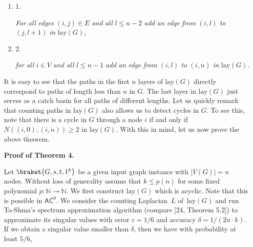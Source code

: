 \begin{enumerate}


\item[] 
1. 


\emph{For all edges }$(i,j)\in E$\emph{ and all }$l\leq n-2$\emph{ add an edge from }$(i,l)$\emph{ to }$(j,l+1)$\emph{ in }$\mathrm{lay}(G)$\emph{,}\par





\item[] 
2. 


\emph{for all }$i\in V$\emph{ and all }$l\leq n-1$\emph{ add an edge from }$(i,l)$\emph{ to }$(i,n)$\emph{ in }$\mathrm{lay}(G)$\emph{.}\par





\end{enumerate}






It is easy to see that the paths in the first $n$ layers of $\mathrm{lay}(G)$ directly correspond to paths of length less than $n$ in $G$.
The last layer in $\mathrm{lay}(G)$ just serves as a catch basin for all paths of different lengths.
Let us quickly remark that counting paths in $\mathrm{lay}(G)$ also allows us to detect cycles in $G$. To see this, note that there is a cycle in $G$ through a node $i$ if and only if $N((i,0),(i,n))\geq 2$ in $\mathrm{lay}(G)$.
With this in mind, let us now prove the above theorem.\par




\par\medskip\noindent\textbf{Proof of Theorem 4.}\par




Let $\braket{G,s,t,1^{k}}$ be a given input graph instance with $|V(G)|=n$ nodes.
Without loss of generality assume that $k\leq p(n)$ for some fixed polynomial $p:\mathbb{N}\rightarrow\mathbb{N}$.
We first construct $\mathrm{lay}(G)$ which is acyclic. Note that this is possible in $\mathsf{AC}^{0}$.
We consider the counting Laplacian $L$ of $\mathrm{lay}(G)$ and run Ta-Shma’s spectrum approximation algorithm (compare [24, Theorem 5.2]) to approximate its singular values with error $\varepsilon=1/6$ and accuracy $\delta=1/(2n\cdot k)$.
If we obtain a singular value smaller than $\delta$, then we have with probability at least $5/6$,\par


